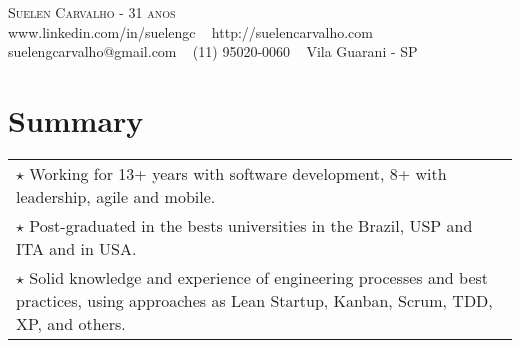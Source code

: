 \documentclass[a4paper, oneside, final]{scrartcl}
\newcommand{\vspc}{\vspace{0.15cm}} %
\begin{document}
\begin{center}

\textsc{\Huge{Suelen Carvalho - 31 anos}} \vspc\\
{\small\faLinkedin} {\small www.linkedin.com/in/suelengc} \ {\small\faBullseye} {\small http://suelencarvalho.com} \ \\
{\small\faEnvelopeO} {\small suelengcarvalho@gmail.com} \ {\small\faWhatsapp} {\small (11) 95020-0060} \ {\small\faMapMarker} {\small Vila Guarani - SP}






\section{Summary}
\begin{tabularx}{1\linewidth}{X}

$\star$ Working for 13+ years with software development, 8+ with leadership, agile and mobile. \vspc \\

$\star$ Post-graduated in the bests universities in the Brazil, USP and ITA and in USA. \vspc \\

$\star$ Solid knowledge and experience of engineering processes and best practices, using approaches as Lean Startup, Kanban, Scrum, TDD, XP, and others. \vspc \\


\end{tabularx}
\end{center}
\end{document}
